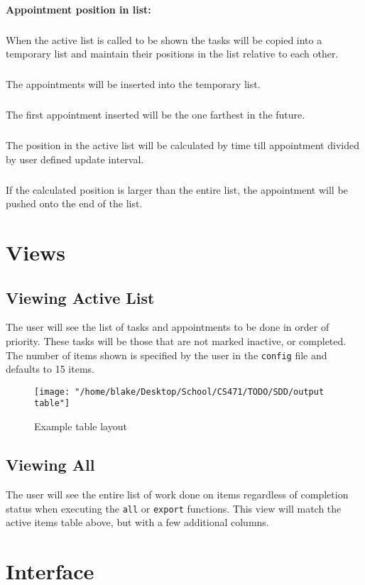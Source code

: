\documentclass[12pt]{article}
\newcommand{\e}[1] {{\tt #1}}
\begin{document}
\paragraph{Appointment position in list:} \label{sec:Sorting - Appointment} 
\subparagraph{}When the active list is called to be shown the tasks will be copied into a temporary list and maintain their positions in the list relative to each other. 
\subparagraph{}The appointments will be inserted into the temporary list. 
\subparagraph{}The first appointment inserted will be the one farthest in the future. 
\subparagraph{}The position in the active list will be calculated by time till appointment divided by user defined update interval. 
\subparagraph{}If the calculated position is larger than the entire list, the appointment will be pushed onto the end of the list.


\section{Views}
\subsection{Viewing Active List}
The user will see the list of tasks and appointments to be done in order of priority. These tasks will be those that are not marked inactive, or completed. The number of items shown is specified by the user in the \e{config} file and defaults to 15 items. 
\\
\begin{center}
\begin{figure}[H]
\texttt{[image: "/home/blake/Desktop/School/CS471/TODO/SDD/output table"]}
\caption{Example table layout}
\label{fig:table}
\end{figure}
\end{center}

\subsection{Viewing All} \label{sec:View all}
The user will see the entire list of work done on items regardless of completion status when executing the \e{all} or \e{export} functions.
This view will match the active items table above, but with a few additional columns.

\section{Interface}
\end{document}
